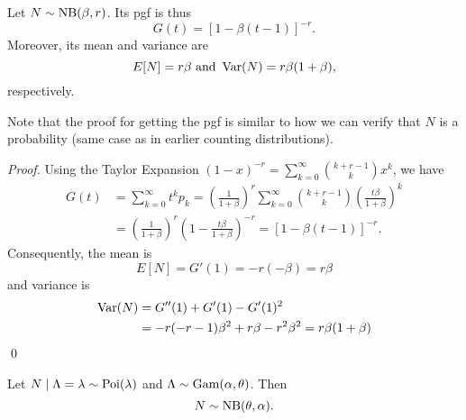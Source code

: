 \documentclass[notoc,notitlepage]{tufte-book}
\begin{document}
\begin{propo}\label{propo:pgf_of_the_negative_binomial_distribution}
  Let $N \sim \operatorname{NB}(\beta, r)$. Its pgf is thus
  \begin{equation*}
    G(t) = [1 - \beta(t - 1)]^{-r}.
  \end{equation*}
  Moreover, its mean and variance are
  \begin{equation*}
    E[N] = r \beta \text{ and } \operatorname{Var}(N) = r\beta(1 + \beta),
  \end{equation*}
  respectively.
\end{propo}

\begin{note}
  Note that the proof for getting the pgf is similar to how we can verify that $N$ is a probability (same case as in earlier counting distributions).
\end{note}

\begin{proof}
  Using the Taylor Expansion $(1 - x)^{-r} = \sum_{k=0}^{\infty} \binom{k + r - 1}{k} x^k$, we have
  \begin{align*}
    G(t) &= \sum_{k=0}^{\infty} t^k p_k = \left( \frac{1}{1 + \beta} \right)^r \sum_{k=0}^{\infty} \binom{k + r - 1}{k} \left( \frac{t \beta}{1 + \beta} \right)^k \\
         &= \left( \frac{1}{1 + \beta} \right)^r \left( 1 - \frac{t \beta}{1 + \beta} \right)^{-r} = [ 1 - \beta (t - 1) ]^{-r}.
  \end{align*}
  Consequently, the mean is
  \begin{equation*}
    E[N] = G'(1) = -r(-\beta) = r \beta
  \end{equation*}
  and variance is
  \begin{align*}
    \operatorname{Var}(N) &= G''(1) + G'(1) - G'(1)^2 \\
            &= -r ( -r - 1 ) \beta^2 + r \beta - r^2 \beta^2 = r \beta ( 1 + \beta )
  \end{align*}\qed\
\end{proof}

\begin{propo}\label{propo:negative_binomial_from_poisson_conditioned_on_gamma}
  Let $N \mid \Lambda = \lambda \sim \operatorname{Poi}(\lambda)$ and $\Lambda \sim \operatorname{Gam}(\alpha, \theta)$. Then
  \begin{equation*}
    N \sim \operatorname{NB}(\theta, \alpha).
  \end{equation*}
\end{propo}
\end{document}
